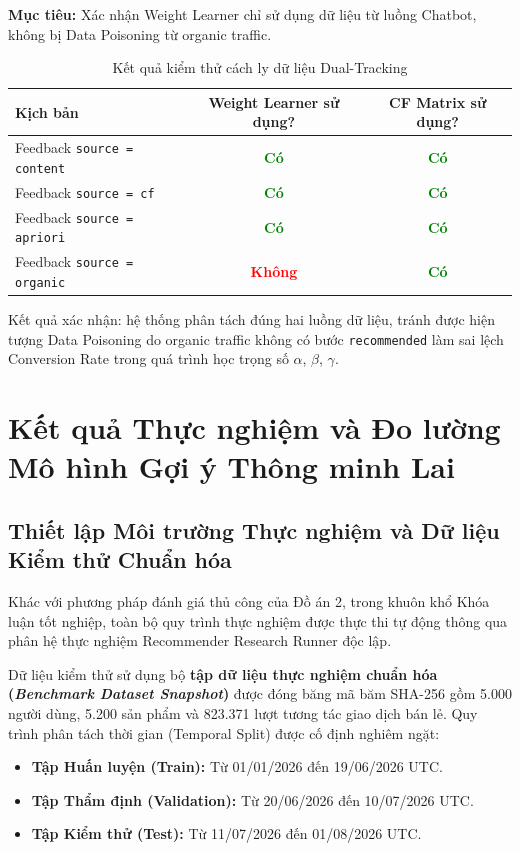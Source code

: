 \documentclass[12pt,a4paper]{report}
\begin{document}
\textbf{Mục tiêu:} Xác nhận Weight Learner chỉ sử dụng dữ liệu từ luồng Chatbot, không bị Data Poisoning từ organic traffic.

\begin{table}[htbp]
\centering
\renewcommand{\arraystretch}{1.3}
\begin{tabular}{|l|c|c|}
\hline
\rowcolor[HTML]{EFEFEF}
\textbf{Kịch bản} & \textbf{Weight Learner sử dụng?} & \textbf{CF Matrix sử dụng?} \\ \hline
Feedback \texttt{source = content} & \textcolor{green}{\textbf{Có}} & \textcolor{green}{\textbf{Có}} \\ \hline
Feedback \texttt{source = cf} & \textcolor{green}{\textbf{Có}} & \textcolor{green}{\textbf{Có}} \\ \hline
Feedback \texttt{source = apriori} & \textcolor{green}{\textbf{Có}} & \textcolor{green}{\textbf{Có}} \\ \hline
Feedback \texttt{source = organic} & \textcolor{red}{\textbf{Không}} & \textcolor{green}{\textbf{Có}} \\ \hline
\end{tabular}
\caption{Kết quả kiểm thử cách ly dữ liệu Dual-Tracking}
\end{table}

Kết quả xác nhận: hệ thống phân tách đúng hai luồng dữ liệu, tránh được hiện tượng Data Poisoning do organic traffic không có bước \texttt{recommended} làm sai lệch Conversion Rate trong quá trình học trọng số $\alpha$, $\beta$, $\gamma$.

\section{Kết quả Thực nghiệm và Đo lường Mô hình Gợi ý Thông minh Lai}

\subsection{Thiết lập Môi trường Thực nghiệm và Dữ liệu Kiểm thử Chuẩn hóa}
Khác với phương pháp đánh giá thủ công của Đồ án 2, trong khuôn khổ Khóa luận tốt nghiệp, toàn bộ quy trình thực nghiệm được thực thi tự động thông qua phân hệ thực nghiệm Recommender Research Runner độc lập. 

Dữ liệu kiểm thử sử dụng bộ \textbf{tập dữ liệu thực nghiệm chuẩn hóa (\textit{Benchmark Dataset Snapshot})} được đóng băng mã băm SHA-256 gồm 5.000 người dùng, 5.200 sản phẩm và 823.371 lượt tương tác giao dịch bán lẻ. Quy trình phân tách thời gian (Temporal Split) được cố định nghiêm ngặt:
\begin{itemize}
    \item \textbf{Tập Huấn luyện (Train):} Từ 01/01/2026 đến 19/06/2026 UTC.
    \item \textbf{Tập Thẩm định (Validation):} Từ 20/06/2026 đến 10/07/2026 UTC.
    \item \textbf{Tập Kiểm thử (Test):} Từ 11/07/2026 đến 01/08/2026 UTC.
\end{itemize}
\end{document}

